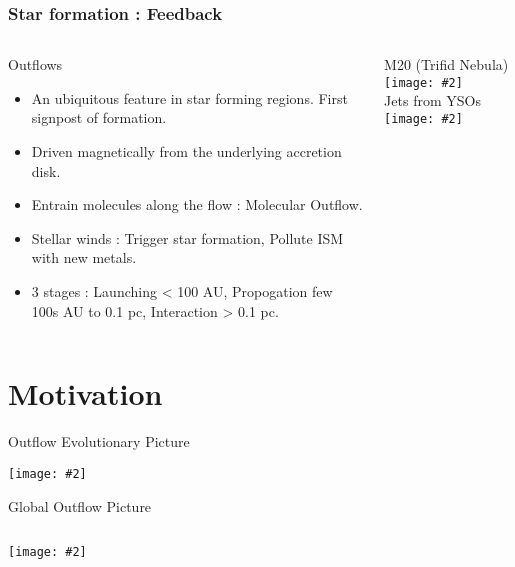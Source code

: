 \documentclass[8pt,xcolor=dvipsnames]{beamer}
\newcommand{\figpath}{./NEWFIGS/}
\newcommand{\spic}[2]{\texttt{[image: \#2]}}
\newcommand{\myref}[1]{{\small{\color{red}{(#1)}}}}
\begin{document}
\begin{frame}
\frametitle{Star formation : Feedback}
\begin{columns}
\begin{column}{0.45\textwidth}
\begin{block}{Outflows}
\begin{itemize}
\item An ubiquitous feature in star forming regions. First signpost of formation.
\item Driven magnetically from the underlying accretion disk. 
\item Entrain molecules along the flow : Molecular Outflow.
\item Stellar winds : Trigger star formation, Pollute ISM with new
  metals. 
\item 3 stages : Launching < 100 AU, Propogation few 100s AU to 0.1
  pc, Interaction > 0.1 pc.   
\end{itemize}
\end{block}
\end{column}
\begin{column}{0.55\textwidth}
M20 (Trifid Nebula) \spic{0.35}{\figpath/trigg_sf.jpg}\\
Jets from YSOs \spic{0.14}{\figpath/jets_yso.JPG}
\end{column}
\end{columns}
\end{frame}




\section{Motivation}
\begin{frame}{Outflow Evolutionary Picture \myref{Beuther \& Sheperd
      2005, Vaidya 2011}}
\begin{center}
\spic{0.1}{/Users/bhargavvaidya/THESIS/Intro_Figs/evol_outflow_n.pdf}
\end{center}
\end{frame}

\begin{frame}{Global Outflow Picture}
\begin{columns}
\begin{column}{1.0\textwidth}{\myref{Vaidya 2009}}
\spic{0.33}{/Users/bhargavvaidya/THESIS/chapter2/figures/f5_col.pdf}
\end{column}
\end{columns}
\end{frame}
\end{document}
